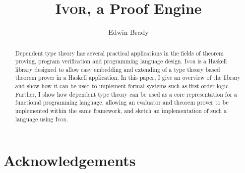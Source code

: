 \documentclass[orivec,dvips,10pt]{llncs}
\newcommand{\Ivor}{\textsc{Ivor}}
\begin{document}
\title{\Ivor{}, a Proof Engine}
\author{Edwin Brady}

 
\maketitle

\begin{abstract}
Dependent type theory has several practical applications in the fields
of theorem proving, program verification and programming language
design. \Ivor{} is a Haskell library designed to allow easy embedding
and extending of a type theory based theorem prover in a Haskell
application. In this paper, I give an overview of the library and show
how it can be used to implement formal systems such as first order
logic.  Further, I show how dependent type theory can be used as a
core representation for a functional programming language, allowing an
evaluator and theorem prover to be implemented within the same
framework, and sketch an implementation of such a language using
\Ivor{}.

\end{abstract}





%







\section*{Acknowledgements}



\begin{small}


%

\end{small}
\end{document}
